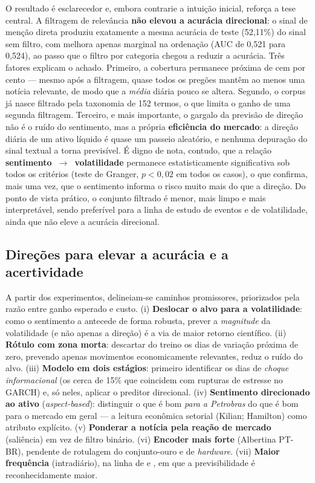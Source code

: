 O resultado é esclarecedor e, embora contrarie a intuição inicial, reforça a tese central. A
filtragem de relevância \textbf{não elevou a acurácia direcional}: o sinal de menção direta produziu
exatamente a mesma acurácia de teste (52,11\%)
do sinal sem filtro, com melhora apenas marginal na ordenação (AUC de
0,521 para 0,524),
ao passo que o filtro por categoria chegou a reduzir a acurácia. Três fatores explicam o achado.
Primeiro, a cobertura permanece próxima de cem por cento --- mesmo após a filtragem, quase todos os
pregões mantêm ao menos uma notícia relevante, de modo que a \emph{média} diária pouco se altera.
Segundo, o corpus já nasce filtrado pela taxonomia de 152 termos, o que limita o ganho de uma segunda
filtragem. Terceiro, e mais importante, o gargalo da previsão de direção não é o ruído do sentimento,
mas a própria \textbf{eficiência do mercado}: a direção diária de um ativo líquido é quase um passeio
aleatório, e nenhuma depuração do sinal textual a torna previsível. É digno de nota, contudo, que a
relação \textbf{sentimento~$\rightarrow$~volatilidade} permanece estatisticamente significativa sob
todos os critérios (teste de Granger, $p < 0{,}02$ em todos os casos), o que confirma, mais uma vez,
que o sentimento informa o risco muito mais do que a direção. Do ponto de vista prático, o conjunto
filtrado é menor, mais limpo e mais interpretável, sendo preferível para a linha de estudo de eventos
e de volatilidade, ainda que não eleve a acurácia direcional.

\subsection{Direções para elevar a acurácia e a acertividade}
\label{sec:direcoes_melhoria}

A partir dos experimentos, delineiam-se caminhos promissores, priorizados pela razão entre ganho
esperado e custo. (i) \textbf{Deslocar o alvo para a volatilidade}: como o sentimento a antecede de
forma robusta, prever a \emph{magnitude} da volatilidade (e não apenas a direção) é a via de maior
retorno científico. (ii) \textbf{Rótulo com zona morta}: descartar do treino os dias de variação
próxima de zero, prevendo apenas movimentos economicamente relevantes, reduz o ruído do alvo. (iii)
\textbf{Modelo em dois estágios}: primeiro identificar os dias de \emph{choque informacional} (os
cerca de 15\% que coincidem com rupturas de estresse no GARCH) e, só neles, aplicar o preditor
direcional. (iv) \textbf{Sentimento direcionado ao ativo} (\textit{aspect-based}): distinguir o que é
bom \emph{para a Petrobras} do que é bom para o mercado em geral --- a leitura econômica setorial
(Kilian; Hamilton) como atributo explícito. (v) \textbf{Ponderar a notícia pela reação de mercado}
(saliência) em vez de filtro binário. (vi) \textbf{Encoder mais forte} (Albertina PT-BR), pendente de
rotulagem do conjunto-ouro e de \textit{hardware}. (vii) \textbf{Maior frequência} (intradiário),
na linha de  e , em que a
previsibilidade é reconhecidamente maior.
